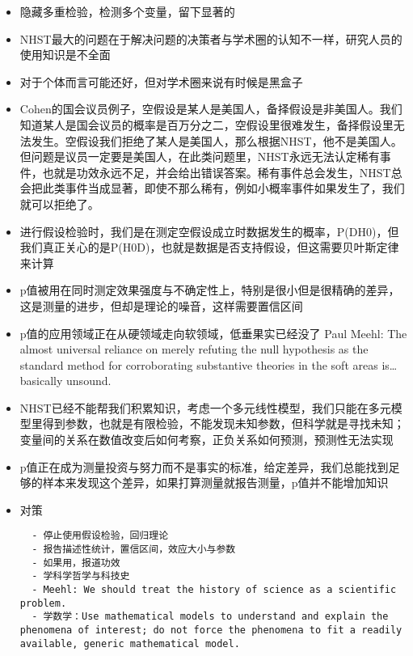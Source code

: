 \documentclass[]{tufte-book}
\begin{document}
\begin{itemize}
\item
  隐藏多重检验，检测多个变量，留下显著的
\item
  NHST最大的问题在于解决问题的决策者与学术圈的认知不一样，研究人员的使用知识是不全面
\item
  对于个体而言可能还好，但对学术圈来说有时候是黑盒子
\item
  Cohen的国会议员例子，空假设是某人是美国人，备择假设是非美国人。我们知道某人是国会议员的概率是百万分之二，空假设里很难发生，备择假设里无法发生。空假设我们拒绝了某人是美国人，那么根据NHST，他不是美国人。但问题是议员一定要是美国人，在此类问题里，NHST永远无法认定稀有事件，也就是功效永远不足，并会给出错误答案。稀有事件总会发生，NHST总会把此类事件当成显著，即使不那么稀有，例如小概率事件如果发生了，我们就可以拒绝了。
\item
  进行假设检验时，我们是在测定空假设成立时数据发生的概率，P(D\textbar{}H0)，但我们真正关心的是P(H0\textbar{}D)，也就是数据是否支持假设，但这需要贝叶斯定律来计算
\item
  p值被用在同时测定效果强度与不确定性上，特别是很小但是很精确的差异，这是测量的进步，但却是理论的噪音，这样需要置信区间
\item
  p值的应用领域正在从硬领域走向软领域，低垂果实已经没了
  Paul Meehl:
  The almost universal reliance on merely refuting the null hypothesis as the standard method for corroborating substantive theories in the soft areas is\ldots{} basically unsound.
\item
  NHST已经不能帮我们积累知识，考虑一个多元线性模型，我们只能在多元模型里得到参数，也就是有限检验，不能发现未知参数，但科学就是寻找未知；变量间的关系在数值改变后如何考察，正负关系如何预测，预测性无法实现
\item
  p值正在成为测量投资与努力而不是事实的标准，给定差异，我们总能找到足够的样本来发现这个差异，如果打算测量就报告测量，p值并不能增加知识
\item
  对策

\begin{verbatim}
  - 停止使用假设检验，回归理论
  - 报告描述性统计，置信区间，效应大小与参数
  - 如果用，报道功效
  - 学科学哲学与科技史
  - Meehl: We should treat the history of science as a scientific problem.
  - 学数学：Use mathematical models to understand and explain the phenomena of interest; do not force the phenomena to fit a readily available, generic mathematical model.
\end{verbatim}
\end{itemize}
\end{document}
